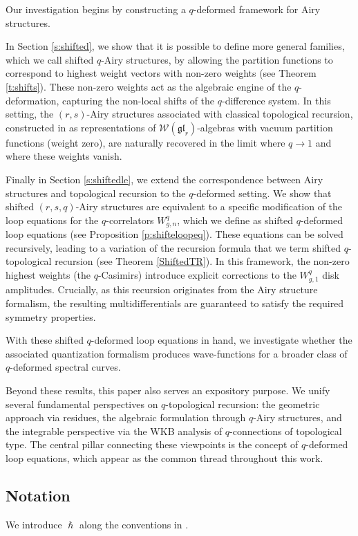 \documentclass[reqno,11pt]{amsart}
\theoremstyle{plain}
\theoremstyle{definition}
\theoremstyle{remark}
\numberwithin{equation}{section}
\newcommand{\1}{\mathds{1}}
\newcommand{\2}{\frac{1}{2}}
\begin{document}
	
	
	Our investigation begins by constructing a $q$-deformed framework for Airy structures.
	
	In Section \ref{s:shifted}, we show that it is possible to define more general families, which we call shifted $q$-Airy structures, by allowing the partition functions to correspond to highest weight vectors with non-zero weights (see Theorem \ref{t:shifts}). These non-zero weights act as the algebraic engine of the $q$-deformation, capturing the non-local shifts of the $q$-difference system. In this setting, the $(r,s)$-Airy structures associated with classical topological recursion, constructed in \cite{BBCCN18} as representations of $\mathcal{W}(\mathfrak{gl}_r)$-algebras with vacuum partition functions (weight zero), are naturally recovered in the limit where $q \to 1$ and where these weights vanish.
	
	Finally in Section \ref{s:shiftedle}, we extend the correspondence between Airy structures and topological recursion to the $q$-deformed setting. We show that shifted $(r,s,q)$-Airy structures are equivalent to a specific modification of the loop equations for the $q$-correlators $W^q_{g,n}$, which we define as shifted $q$-deformed loop equations (see Proposition \ref{p:shifteloopeq}). These equations can be solved recursively, leading to a variation of the recursion formula that we term shifted $q$-topological recursion (see Theorem \ref{ShiftedTR}). In this framework, the non-zero highest weights (the $q$-Casimirs) introduce explicit corrections to the $W^q_{g,1}$ disk amplitudes. Crucially, as this recursion originates from the Airy structure formalism, the resulting multidifferentials are guaranteed to satisfy the required symmetry properties.
	
	With these shifted $q$-deformed loop equations in hand, we investigate whether the associated quantization formalism produces wave-functions for a broader class of $q$-deformed spectral curves. 
	
	Beyond these results, this paper also serves an expository purpose. We unify several fundamental perspectives on $q$-topological recursion: the geometric approach via residues, the algebraic formulation through $q$-Airy structures, and the integrable perspective via the WKB analysis of $q$-connections of topological type. The central pillar connecting these viewpoints is the concept of $q$-deformed loop equations, which appear as the common thread throughout this work.
	
	\subsection{Notation}
	We introduce $\hslash$ along the conventions in \cite{BCJ22}. 
	
\end{document}
